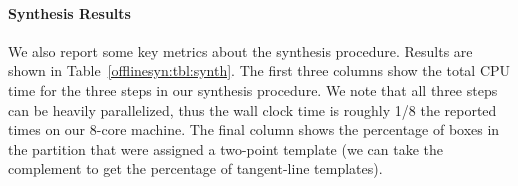 \paragraph{Synthesis Results} We also report some key metrics about the
synthesis procedure. Results are shown in Table~\ref{offlinesyn:tbl:synth}. The
first
three columns show the total CPU time for the three steps in our synthesis procedure. We
note that all three steps can be heavily parallelized, thus the wall clock time
is roughly 1/8 the reported times on our 8-core machine. The final column shows
the percentage of boxes in the partition that were assigned a two-point
template (we can take the complement to get the percentage of tangent-line
templates).

